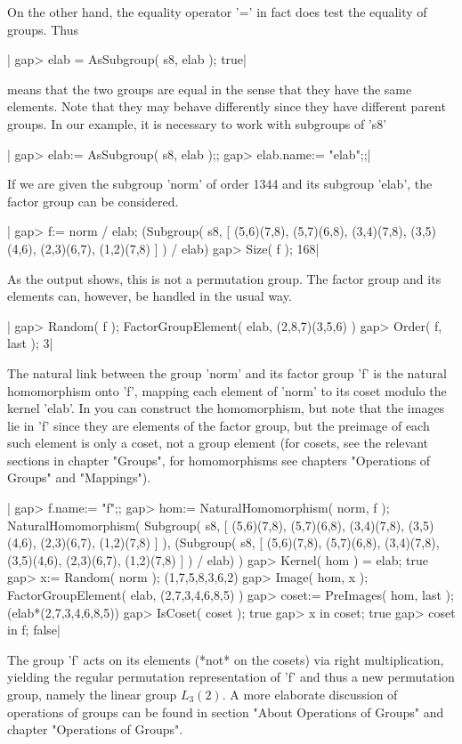 On  the  other  hand, the  equality operator  '='  in  fact does test the
equality of groups.  Thus

|    gap> elab = AsSubgroup( s8, elab );
    true|

means that the two  groups are equal in the sense that they have the same
elements.   Note  that  they  may  behave  differently  since  they  have
different parent groups.  In our example,  it  is  necessary to work with
subgroups of 's8'\:

|    gap> elab:= AsSubgroup( s8, elab );;
    gap> elab.name:= "elab";;|

If  we are  given the  subgroup  'norm' of  order  1344  and its subgroup
'elab', the factor group can be considered.

|    gap> f:= norm / elab;
    (Subgroup( s8, [ (5,6)(7,8), (5,7)(6,8), (3,4)(7,8), (3,5)(4,6),
      (2,3)(6,7), (1,2)(7,8) ] ) / elab)
    gap> Size( f );
    168|

As the output shows, this is not  a permutation group.  The  factor group
and its elements can, however, be handled in the usual way.

|    gap> Random( f );
    FactorGroupElement( elab, (2,8,7)(3,5,6) )
    gap> Order( f, last );
    3|

The natural link between the group 'norm' and its factor group 'f' is the
natural  homomorphism onto 'f', mapping each element  of  'norm'  to  its
coset  modulo  the  kernel  'elab'.   In {\GAP}  you  can  construct  the
homomorphism, but note that the images lie in 'f' since they are elements
of  the  factor group, but the preimage  of each  such  element is only a
coset,  not a  group element (for  cosets,  see  the relevant sections in
chapter  "Groups", for homomorphisms  see chapters "Operations of Groups"
and "Mappings").

|    gap> f.name:= "f";;
    gap> hom:= NaturalHomomorphism( norm, f );
    NaturalHomomorphism( Subgroup( s8,
    [ (5,6)(7,8), (5,7)(6,8), (3,4)(7,8), (3,5)(4,6), (2,3)(6,7),
      (1,2)(7,8) ] ), (Subgroup( s8,
    [ (5,6)(7,8), (5,7)(6,8), (3,4)(7,8), (3,5)(4,6), (2,3)(6,7),
      (1,2)(7,8) ] ) / elab) )
    gap> Kernel( hom ) = elab;
    true
    gap> x:= Random( norm );
    (1,7,5,8,3,6,2)
    gap> Image( hom, x );
    FactorGroupElement( elab, (2,7,3,4,6,8,5) )
    gap> coset:= PreImages( hom, last );
    (elab*(2,7,3,4,6,8,5))
    gap> IsCoset( coset );
    true
    gap> x in coset;
    true
    gap> coset in f;
    false|

The  group 'f'  acts  on  its elements (*not*  on the  cosets)  via right
multiplication,  yielding the  regular permutation representation of  'f'
and thus  a new permutation group, namely  the linear  group $L_3(2)$.  A
more elaborate discussion of operations of groups can be found in section
"About Operations of Groups" and chapter "Operations of Groups".

